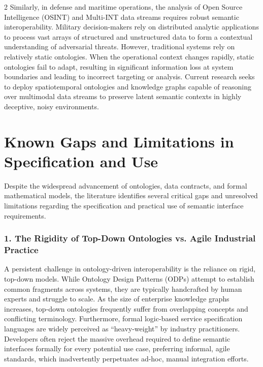 \documentclass[11pt,letterpaper]{article}
\begin{document}
\begin{multicols*}{2}
Similarly, in defense and maritime operations, the analysis of Open Source Intelligence (OSINT) and Multi-INT data streams requires robust semantic interoperability. Military decision-makers rely on distributed analytic applications to process vast arrays of structured and unstructured data to form a contextual understanding of adversarial threats. However, traditional systems rely on relatively static ontologies. When the operational context changes rapidly, static ontologies fail to adapt, resulting in significant information loss at system boundaries and leading to incorrect targeting or analysis. Current research seeks to deploy spatiotemporal ontologies and knowledge graphs capable of reasoning over multimodal data streams to preserve latent semantic contexts in highly deceptive, noisy environments.

\section{Known Gaps and Limitations in Specification and Use}
Despite the widespread advancement of ontologies, data contracts, and formal mathematical models, the literature identifies several critical gaps and unresolved limitations regarding the specification and practical use of semantic interface requirements.

\subsubsection{1. The Rigidity of Top-Down Ontologies vs. Agile Industrial Practice}
A persistent challenge in ontology-driven interoperability is the reliance on rigid, top-down models. While Ontology Design Patterns (ODPs) attempt to establish common fragments across systems, they are typically handcrafted by human experts and struggle to scale. As the size of enterprise knowledge graphs increases, top-down ontologies frequently suffer from overlapping concepts and conflicting terminology. Furthermore, formal logic-based service specification languages are widely perceived as ``heavy-weight'' by industry practitioners. Developers often reject the massive overhead required to define semantic interfaces formally for every potential use case, preferring informal, agile standards, which inadvertently perpetuates ad-hoc, manual integration efforts.


\end{multicols*}
\end{document}
